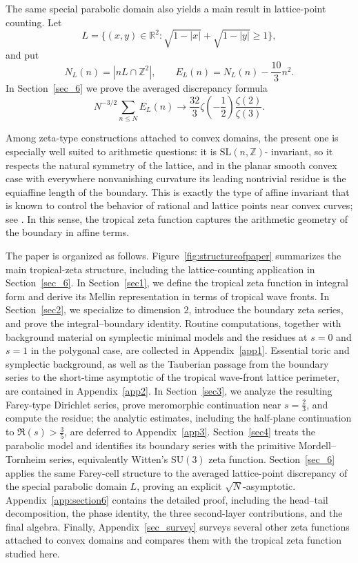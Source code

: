 \documentclass[a4paper,american,11pt]{amsart}
\theoremstyle{plain}
\theoremstyle{definition}
\newcommand{\Z}{\mathbb Z}
\newcommand{\R}{\mathbb R}
\begin{document}
The same special parabolic domain also yields a main result in lattice-point
counting. Let
\[
L=\{(x,y)\in\R^2:\sqrt{1-|x|}+\sqrt{1-|y|}\ge 1\},
\]
and put
\[
N_L(n)=|nL\cap\Z^2|,
\qquad
E_L(n)=N_L(n)-\frac{10}{3}n^2.
\]
In Section~\ref{sec_6} we prove the averaged discrepancy formula
\[
N^{-3/2}\sum_{n\le N}E_L(n)
\longrightarrow
\frac{32}{3}\zeta\!\left(-\frac12\right)\frac{\zeta(2)}{\zeta(3)}.
\]

Among zeta-type constructions attached to convex domains, the present one is
especially well suited to arithmetic questions: it is \(\mathrm{SL}(n,\Z)\)-
invariant, so it respects the natural symmetry of the lattice, and in the
planar smooth convex case with everywhere nonvanishing curvature its leading
nontrivial residue is the equiaffine length of the boundary. This is exactly
the type of affine invariant that is known to control the behavior of rational
and lattice points near convex curves; see
\cite{Petrov2006,HowardTrifonov2022,Howard2023}. In this sense, the tropical
zeta function captures the arithmetic geometry of the boundary in affine
terms.

The paper is organized as follows. Figure~\ref{fig:structureofpaper}
summarizes the main tropical-zeta structure, including the lattice-counting
application in Section~\ref{sec_6}. In Section~\ref{sec1}, we define the
tropical zeta function in integral form and derive its Mellin representation in
terms of tropical wave fronts. In Section~\ref{sec2}, we specialize to
dimension \(2\), introduce the boundary zeta series, and prove the
integral--boundary identity. Routine computations, together with background
material on symplectic minimal models and the residues at \(s=0\) and \(s=1\)
in the polygonal case, are collected in Appendix~\ref{app1}. Essential toric
and symplectic background, as well as the Tauberian passage from the boundary
series to the short-time asymptotic of the tropical wave-front lattice
perimeter, are contained in Appendix~\ref{app2}. In Section~\ref{sec3}, we
analyze the resulting Farey-type Dirichlet series, prove meromorphic
continuation near \(s=\frac23\), and compute the residue; the analytic
estimates, including the half-plane continuation to \(\Re(s)>\frac35\), are
deferred to Appendix~\ref{app3}. Section~\ref{sec4} treats the parabolic model
and identifies its boundary series with the primitive Mordell--Tornheim series,
equivalently Witten's \(\mathrm{SU}(3)\) zeta function. Section~\ref{sec_6}
applies the same Farey-cell structure to the averaged lattice-point
discrepancy of the special parabolic domain \(L\), proving an explicit
\(\sqrt N\)-asymptotic. Appendix~\ref{app:section6} contains the detailed
proof, including the head--tail decomposition, the phase identity, the three
second-layer contributions, and the final algebra. Finally,
Appendix~\ref{sec_survey} surveys several other zeta functions attached to
convex domains and compares them with the tropical zeta function studied here.
\end{document}
